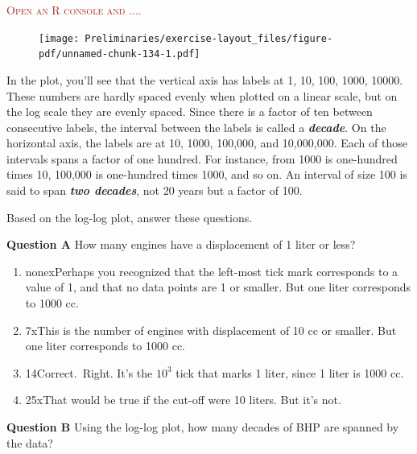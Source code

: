 \documentclass[
  letterpaper,
  DIV=11,
  numbers=noendperiod,
  oneside]{article}
\providecommand{\tightlist}{%
  \setlength{\itemsep}{0pt}\setlength{\parskip}{0pt}}\usepackage{longtable,booktabs,array}
\newenvironment{scaffolding}%
{%
\textcolor{brown}{\hrulefill}%
  \par\vspace{.3\baselineskip}%
  \textcolor{brown}{\scshape Open an R console and ....}%
  \par\vspace{\baselineskip}%
}%
{\textcolor{brown}{\hrulefill}}
\begin{document}
\begin{multicols}{2}
\begin{scaffolding}
\begin{figure}[H]

{\centering \texttt{[image: Preliminaries/exercise-layout\_files/figure-pdf/unnamed-chunk-134-1.pdf]}

}

\end{figure}

\end{scaffolding}

In the plot, you'll see that the vertical axis has labels at 1, 10, 100,
1000, 10000. These numbers are hardly spaced evenly when plotted on a
linear scale, but on the log scale they are evenly spaced. Since there
is a factor of ten between consecutive labels, the interval between the
labels is called a \textbf{\emph{decade}}. On the horizontal axis, the
labels are at 10, 1000, 100,000, and 10,000,000. Each of those intervals
spans a factor of one hundred. For instance, from 1000 is one-hundred
times 10, 100,000 is one-hundred times 1000, and so on. An interval of
size 100 is said to span \textbf{\emph{two decades}}, not 20 years but a
factor of 100.

Based on the log-log plot, answer these questions.

\textbf{Question A} How many engines have a displacement of 1 liter or
less?

\begin{enumerate}
\def\labelenumi{\roman{enumi}.}
\tightlist
\item
  {none{xPerhaps you recognized that the left-most tick mark
  corresponds to a value of 1, and that no data points are 1 or smaller.
  But one liter corresponds to 1000 cc.}}\\
\item
  {7{xThis is the number of engines with displacement of 10 cc or
  smaller. But one liter corresponds to 1000 cc.}}\\
\item
  {14{Correct.~Right. It's the \(10^3\) tick that marks 1 liter, since 1
  liter is 1000 cc.}}\\
\item
  {25{xThat would be true if the cut-off were 10 liters. But it's
  not.}}
\end{enumerate}

\textbf{Question B} Using the log-log plot, how many decades of BHP are
spanned by the data?


\end{multicols}
\end{document}
